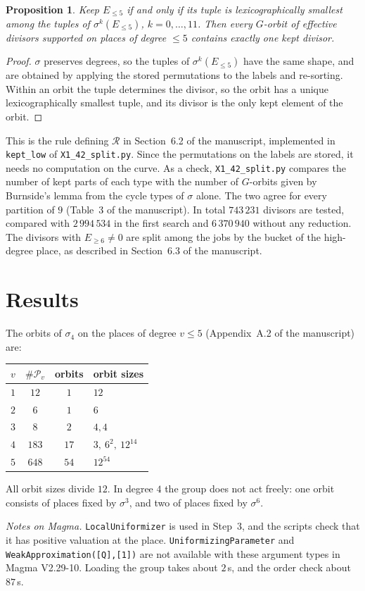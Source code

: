 \documentclass[11pt]{amsart}
\newtheorem{proposition}[theorem]{Proposition}
\theoremstyle{definition}
\theoremstyle{remark}
\newcommand{\Pl}{\mathcal{P}}
\newcommand{\code}[1]{\texttt{#1}}
\begin{document}
\begin{proposition}\label{prop:canon}
Keep $E_{\le5}$ if and only if its tuple is lexicographically smallest among the tuples of $\sigma^k(E_{\le5})$, $k=0,\dots,11$. Then every $G$-orbit of effective divisors supported on places of degree $\le5$ contains exactly one kept divisor.
\end{proposition}

\begin{proof}
$\sigma$ preserves degrees, so the tuples of $\sigma^k(E_{\le5})$ have the same shape, and are obtained by applying the stored permutations to the labels and re-sorting. Within an orbit the tuple determines the divisor, so the orbit has a unique lexicographically smallest tuple, and its divisor is the only kept element of the orbit.
\end{proof}

This is the rule defining $\mathcal{R}$ in Section~6.2 of the manuscript, implemented in \code{kept\_low} of \code{X1\_42\_split.py}. Since the permutations on the labels are stored, it needs no computation on the curve. As a check, \code{X1\_42\_split.py} compares the number of kept parts of each type with the number of $G$-orbits given by Burnside's lemma from the cycle types of $\sigma$ alone. The two agree for every partition of $9$ (Table~3 of the manuscript). In total $743\,231$ divisors are tested, compared with $2\,994\,534$ in the first search and $6\,370\,940$ without any reduction. The divisors with $E_{\ge6}\neq0$ are split among the jobs by the bucket of the high-degree place, as described in Section~6.3 of the manuscript.

\section{Results}

The orbits of $\sigma_4$ on the places of degree $v\le5$ (Appendix~A.2 of the manuscript) are:
\begin{center}
\begin{tabular}{@{}cccl@{}}
\toprule
$v$ & $\#\Pl_v$ & orbits & orbit sizes\\
\midrule
$1$ & $12$ & $1$ & $12$\\
$2$ & $6$ & $1$ & $6$\\
$3$ & $8$ & $2$ & $4,4$\\
$4$ & $183$ & $17$ & $3,\ 6^2,\ 12^{14}$\\
$5$ & $648$ & $54$ & $12^{54}$\\
\bottomrule
\end{tabular}
\end{center}
All orbit sizes divide $12$. In degree $4$ the group does not act freely: one orbit consists of places fixed by $\sigma^3$, and two of places fixed by $\sigma^6$.

\emph{Notes on Magma.} \code{LocalUniformizer} is used in Step~3, and the scripts check that it has positive valuation at the place. \code{UniformizingParameter} and \code{WeakApproximation([Q],[1])} are not available with these argument types in Magma V2.29-10. Loading the group takes about $2$\,s, and the order check about $87$\,s.
\end{document}
